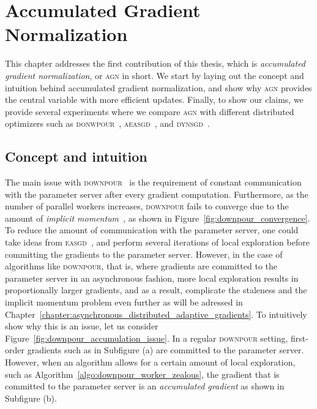 %
%
%

\chapter{Accumulated Gradient Normalization}
\label{chapter:accumulated_gradient_normalization}

This chapter addresses the first contribution of this thesis, which is \emph{accumulated gradient normalization}, or \textsc{agn} in short. We start by laying out the concept and intuition behind accumulated gradient normalization, and show why \textsc{agn} provides the central variable with more efficient updates. Finally, to show our claims, we provide several experiments where we compare \textsc{agn} with different distributed optimizers such as \textsc{donwpour}~\cite{dean2012large}, \textsc{aeasgd}~\cite{zhang2015deep}, and \textsc{dynsgd}~\cite{jiang2017heterogeneity}.

\section{Concept and intuition}
\label{sec:agn_concept}

The main issue with \textsc{downpour}~\cite{dean2012large} is the requirement of constant communication with the parameter server after every gradient computation. Furthermore, as the number of parallel workers increases, \textsc{downpour} fails to converge due to the amount of \emph{implicit momentum}~\cite{implicitmomentum}, as shown in Figure~\ref{fig:downpour_convergence}. To reduce the amount of communication with the parameter server, one could take ideas from \textsc{easgd}~\cite{zhang2015deep}, and perform several iterations of local exploration before committing the gradients to the parameter server. However, in the case of algorithms like \textsc{downpour}, that is, where gradients are committed to the parameter server in an asynchronous fashion, more local exploration results in proportionally larger gradients, and as a result, complicate the staleness and the implicit momentum problem even further as will be adressed in Chapter~\ref{chapter:asynchronous_distributed_adaptive_gradients}. To intuitively show why this is an issue, let us consider Figure~\ref{fig:downpour_accumulation_issue}. In a regular \textsc{downpour} setting, first-order gradients such as in Subfigure (a) are committed to the parameter server. However, when an algorithm allows for a certain amount of local exploration, such as Algorithm~\ref{algo:downpour_worker_zealous}, the gradient that is committed to the parameter server is an \emph{accumulated gradient} as shown in Subfigure (b).

